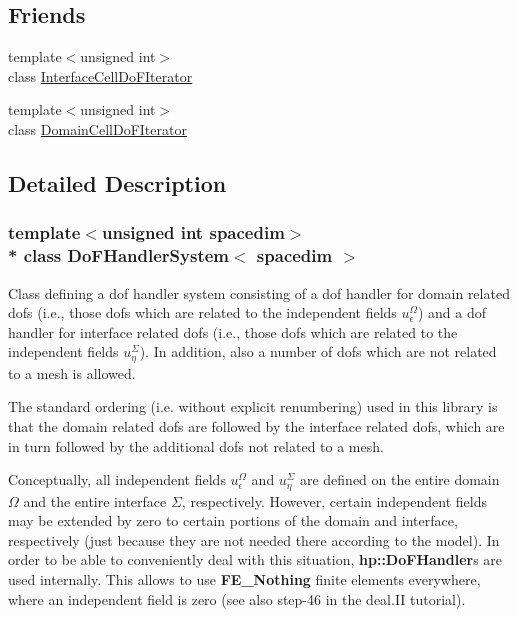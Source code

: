 \subsection*{Friends}
\begin{DoxyCompactItemize}
\item 
{\footnotesize template$<$unsigned int$>$ }\\class \hyperlink{class_do_f_handler_system_a266cb42b2fa4af49d4df0d938f962749}{Interface\+Cell\+Do\+F\+Iterator}
\item 
{\footnotesize template$<$unsigned int$>$ }\\class \hyperlink{class_do_f_handler_system_a22fa60ad60906aacbbe21d3b5704ebfc}{Domain\+Cell\+Do\+F\+Iterator}
\end{DoxyCompactItemize}


\subsection{Detailed Description}
\subsubsection*{template$<$unsigned int spacedim$>$\\*
class Do\+F\+Handler\+System$<$ spacedim $>$}

Class defining a dof handler system consisting of a dof handler for domain related dofs (i.\+e., those dofs which are related to the independent fields $u^\Omega_\epsilon$) and a dof handler for interface related dofs (i.\+e., those dofs which are related to the independent fields $u^\Sigma_\eta$). In addition, also a number of dofs which are not related to a mesh is allowed.

The standard ordering (i.\+e. without explicit renumbering) used in this library is that the domain related dofs are followed by the interface related dofs, which are in turn followed by the additional dofs not related to a mesh.

Conceptually, all independent fields $u^\Omega_\epsilon$ and $u^\Sigma_\eta$ are defined on the entire domain $\Omega$ and the entire interface $\Sigma$, respectively. However, certain independent fields may be extended by zero to certain portions of the domain and interface, respectively (just because they are not needed there according to the model). In order to be able to conveniently deal with this situation, {\bf hp\+::\+Do\+F\+Handler}s are used internally. This allows to use {\bf F\+E\+\_\+\+Nothing} finite elements everywhere, where an independent field is zero (see also step-\/46 in the deal.\+II tutorial).


